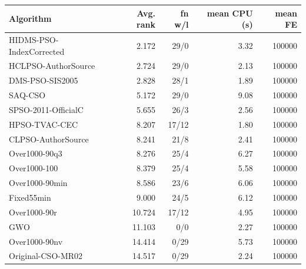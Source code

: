 \begin{tabular}{lrrrr}
\toprule
Algorithm & Avg. rank & fn w/l & mean CPU (s) & mean FE \\
\midrule
HIDMS-PSO-IndexCorrected & 2.172 & 29/0 & 3.32 & 100000 \\
HCLPSO-AuthorSource & 2.724 & 29/0 & 2.13 & 100000 \\
DMS-PSO-SIS2005 & 2.828 & 28/1 & 1.89 & 100000 \\
SAQ-CSO & 5.172 & 29/0 & 9.08 & 100000 \\
SPSO-2011-OfficialC & 5.655 & 26/3 & 2.56 & 100000 \\
HPSO-TVAC-CEC & 8.207 & 17/12 & 1.80 & 100000 \\
CLPSO-AuthorSource & 8.241 & 21/8 & 2.41 & 100000 \\
Over1000-90q3 & 8.276 & 25/4 & 6.27 & 100000 \\
Over1000-100 & 8.379 & 25/4 & 5.58 & 100000 \\
Over1000-90min & 8.586 & 23/6 & 6.06 & 100000 \\
Fixed55min & 9.000 & 24/5 & 6.12 & 100000 \\
Over1000-90r & 10.724 & 17/12 & 4.95 & 100000 \\
GWO & 11.103 & 0/0 & 2.27 & 100000 \\
Over1000-90nv & 14.414 & 0/29 & 5.73 & 100000 \\
Original-CSO-MR02 & 14.517 & 0/29 & 2.24 & 100000 \\
\bottomrule
\end{tabular}
